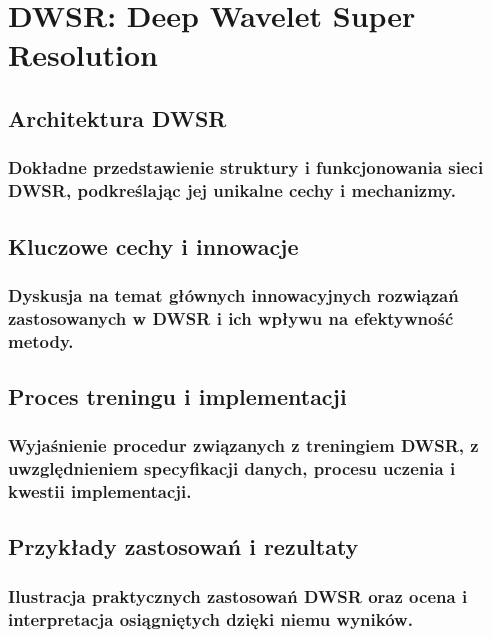 \chapter{DWSR: Deep Wavelet Super Resolution}


\section{Architektura DWSR}


\subsection{Dokładne przedstawienie struktury i funkcjonowania sieci DWSR, podkreślając jej unikalne cechy i mechanizmy.}


\section{Kluczowe cechy i innowacje}


\subsection{Dyskusja na temat głównych innowacyjnych rozwiązań zastosowanych w DWSR i ich wpływu na efektywność metody.}


\section{Proces treningu i implementacji}


\subsection{Wyjaśnienie procedur związanych z treningiem DWSR, z uwzględnieniem specyfikacji danych, procesu uczenia i kwestii implementacji.}


\section{Przykłady zastosowań i rezultaty}


\subsection{Ilustracja praktycznych zastosowań DWSR oraz ocena i interpretacja osiągniętych dzięki niemu wyników.}
